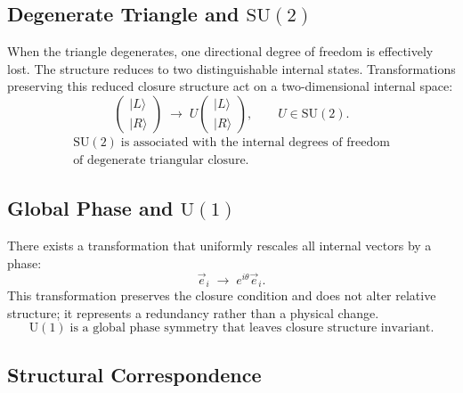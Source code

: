 \subsection{Degenerate Triangle and \texorpdfstring{$\mathrm{SU}(2)$}{SU(2)}}

When the triangle degenerates, one directional degree of freedom is effectively lost.
The structure reduces to two distinguishable internal states.
Transformations preserving this reduced closure structure
act on a two-dimensional internal space:
\begin{equation}
  \begin{pmatrix}|L\rangle\\|R\rangle\end{pmatrix}
  \;\longrightarrow\;
  U\begin{pmatrix}|L\rangle\\|R\rangle\end{pmatrix},
  \qquad U \in \mathrm{SU}(2).
\end{equation}
\begin{equation}
  \boxed{\begin{gathered}
    \mathrm{SU}(2) \;\text{is associated with the internal degrees of freedom} \\
    \text{of degenerate triangular closure.}
  \end{gathered}}
\end{equation}

\subsection{Global Phase and \texorpdfstring{$\mathrm{U}(1)$}{U(1)}}

There exists a transformation that uniformly rescales all internal vectors
by a phase:
\begin{equation}
  \vec{e}_i \;\rightarrow\; e^{i\theta}\vec{e}_i.
\end{equation}
This transformation preserves the closure condition and does not alter
relative structure; it represents a redundancy rather than a physical change.
\begin{equation}
  \boxed{
    \mathrm{U}(1) \;\text{is a global phase symmetry that leaves
    closure structure invariant.}
  }
\end{equation}

\subsection{Structural Correspondence}

